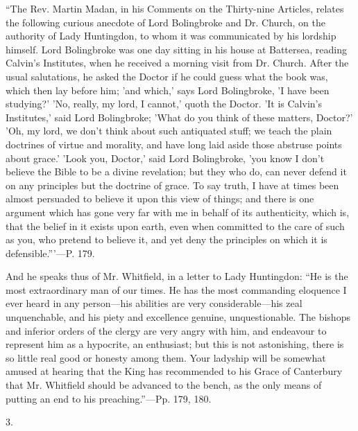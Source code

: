 ``The
Rev. Martin Madan, in his Comments on the Thirty-nine Articles,
relates the following curious anecdote of Lord Bolingbroke and Dr.
Church, on the authority of Lady Huntingdon, to whom it was
communicated by his lordship himself. Lord Bolingbroke was one day
sitting in his house at Battersea, reading Calvin's Institutes, when
he received a morning visit from Dr. Church. After the usual
salutations, he asked the Doctor if he could guess what the book was,
which then lay before him; 'and which,' says Lord Bolingbroke, 'I have
been studying?' 'No, really, my lord, I cannot,' quoth the Doctor. 'It
is Calvin's Institutes,' said Lord Bolingbroke; 'What do you think of
these matters, Doctor?' 'Oh, my lord, we don't think about such
antiquated stuff; we teach the plain doctrines of virtue and morality,
and have long laid aside those abstruse points about grace.' 'Look
you, Doctor,' said Lord
Bolingbroke, 'you know I don't believe the Bible to be a divine
revelation; but they who do, can never defend it on any principles but
the doctrine of grace. To say truth, I have at times been almost
persuaded to believe it upon this view of things; and there is one
argument which has gone very far with me in behalf of its
authenticity, which is, that the belief in it exists upon earth, even
when committed to the care of such as you, who pretend to believe it,
and yet deny the principles on which it is defensible.'''—P. 179.

And he speaks thus of Mr. Whitfield, in a letter
to Lady Huntingdon: ``He is the most extraordinary man of our times. He
has the most commanding eloquence I ever heard in any person—his
abilities are very considerable—his zeal unquenchable, and his piety
and excellence genuine, unquestionable. The bishops and inferior
orders of the clergy are very angry with him, and endeavour to
represent him as a hypocrite, an enthusiast; but this is not
astonishing, there is so little real good or honesty among them. Your
ladyship will be somewhat amused at hearing that the King has
recommended to his Grace of Canterbury that Mr. Whitfield should be
advanced to the bench, as the only means of putting an end to his
preaching.''—Pp. 179, 180.

3.

